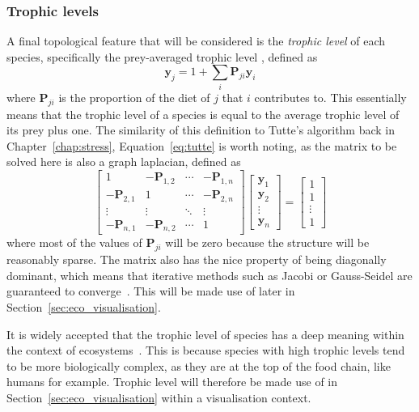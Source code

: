 \subsubsection{Trophic levels}
A final topological feature that will be considered is the \emph{trophic level} of each species, specifically the prey-averaged trophic level \cite{Williams2004}, defined as
\begin{equation}
  \mathbf{y}_j = 1 + \sum_i \mathbf{P}_{ji}\mathbf{y}_i
  \label{eq:trophic}
\end{equation}
where $\mathbf{P}_{ji}$ is the proportion of the diet of $j$ that $i$ contributes to.
This essentially means that the trophic level of a species is equal to the average trophic level of its prey plus one.
The similarity of this definition to Tutte's algorithm back in Chapter~\ref{chap:stress}, Equation~\eqref{eq:tutte} is worth noting, as the matrix to be solved here is also a graph laplacian, defined as
\begin{equation}
  \begin{bmatrix}
  1&-\mathbf{P}_{1,2}&\cdots&-\mathbf{P}_{1,n}\\
  -\mathbf{P}_{2,1}&1&\cdots&-\mathbf{P}_{2,n}\\
  \vdots&\vdots&\ddots&\vdots\\
  -\mathbf{P}_{n,1}&-\mathbf{P}_{n,2}&\cdots&1
  \end{bmatrix}
  \begin{bmatrix}
  \mathbf{y}_1\\\mathbf{y}_2\\\vdots\\\mathbf{y}_n
  \end{bmatrix}
  =
  \begin{bmatrix}
  1\\1\\\vdots\\1
  \end{bmatrix}
  \label{eq:trophic_matrix}
\end{equation}
where most of the values of $\mathbf{P}_{ji}$ will be zero because the structure will be reasonably sparse.
The matrix also has the nice property of being diagonally dominant, which means that iterative methods such as Jacobi or Gauss-Seidel are guaranteed to converge~\cite{Young2014}. This will be made use of later in Section~\ref{sec:eco_visualisation}.

It is widely accepted that the trophic level of species has a deep meaning within the context of ecosystems~\cite{Post2002, Johnson2014}. This is because species with high trophic levels tend to be more biologically complex, as they are at the top of the food chain, like humans for example. Trophic level will therefore be made use of in Section~\ref{sec:eco_visualisation} within a visualisation context.

